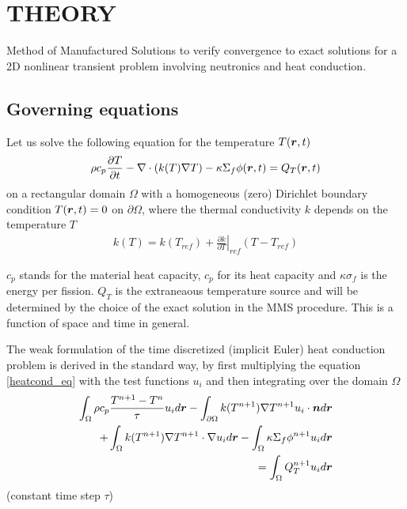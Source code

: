 \section*{THEORY}
Method of Manufactured Solutions to verify convergence to exact solutions for a 2D nonlinear transient problem involving neutronics and heat conduction.

\subsection*{Governing equations}

Let us solve the following equation for the temperature $T(\boldsymbol{r}, t)$
\begin{align}
  \rho c_p \frac{\partial T}{\partial t} 
  - \nabla\cdot(k(T) \nabla T) 
  - \kappa \Sigma_{f} \phi(\boldsymbol{r},t)
  = Q_T(\boldsymbol{r},t) \label{heatcond_eq}
\end{align}
on a rectangular domain $\Omega$ with a homogeneous (zero) Dirichlet boundary condition $T(\boldsymbol{r},t) = 0$ on $\partial\Omega$, where the thermal conductivity $k$ depends on the temperature $T$
\begin{align}
  k(T) = k(T_{ref}) + \left. \frac{\partial k}{\partial T}\right|_{ref} \left( T - T_{ref} \right)
\end{align}

$c_p$ stands for the material heat capacity, $c_p$ for its heat capacity and $\kappa \sigma_{f}$ is the energy per fission.  $Q_T$ is the extraneaous temperature source and will be determined by the choice of the exact solution in the MMS procedure.  This is a function of space and time in general.

The weak formulation of the time discretized (implicit Euler) heat conduction problem is derived in the standard way, by first multiplying the equation \eqref{heatcond_eq} with the test functions $u_{i}$ and then integrating over the domain $\Omega$
\begin{align}
  \int_{\Omega} \rho c_p \frac{T^{n+1}-T{^n}}{\tau} u_i d\boldsymbol{r} 
  - \int_{\partial\Omega} k(T^{n+1}) \nabla T^{n+1} u_i \cdot \boldsymbol{n} d\boldsymbol{r}&  \nonumber \\
  + \int_{\Omega} k(T^{n+1}) \nabla T^{n+1} \cdot \nabla u_i d\boldsymbol{r}
  - \int_{\Omega} \kappa \Sigma_{f} \phi^{n+1} u_i d\boldsymbol{r}& \nonumber \\
  = \int_{\Omega} Q_T^{n+1} u_i d\boldsymbol{r}& \label{heatcond_wf}
\end{align}
(constant time step $\tau$)

